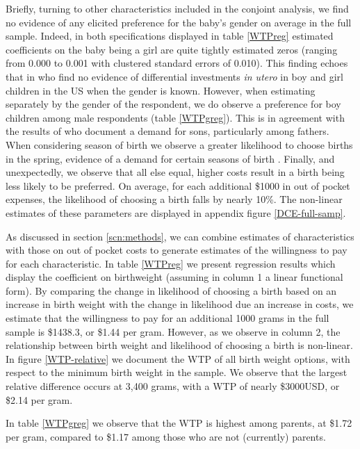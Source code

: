 \documentclass[a4paper, 11pt]{article}
\begin{document}
\begin{spacing}{1.4}
Briefly, turning to other characteristics included in the conjoint analysis,
we find no evidence of any elicited preference for the baby's gender
on average in the full sample.  Indeed, in both specifications displayed
in table \ref{WTPreg} estimated coefficients on the baby being a girl are
quite tightly estimated zeros (ranging from 0.000 to 0.001 with clustered
standard errors of 0.010). This finding echoes that in \citet{LhilaSimon2008}
who find no evidence of differential investments \emph{in utero} in boy and
girl children in the US when the gender is known.  However, when estimating
separately by the gender of the respondent, we do observe a preference for
boy children among male respondents (table \ref{WTPgreg}). This is in
agreement with the results of \citet{DahlMoretti2008} who document a demand
for sons, particularly among fathers.  When considering season of birth
we observe a greater likelihood to choose births in the spring, evidence
of a demand for certain seasons of birth \citep{Clarkeetal2016}. Finally,
and unexpectedly, we observe that all else equal, higher costs result in
a birth being less likely to be preferred.  On average, for each additional
\$1000 in out of pocket expenses, the likelihood of choosing a birth falls by
nearly 10\%.  The non-linear estimates of these parameters are displayed
in appendix figure \ref{DCE-full-samp}.

As discussed in section \ref{scn:methods}, we can combine estimates of
characteristics with those on out of pocket costs to generate estimates
of the willingness to pay for each characteristic.  In table \ref{WTPreg}
we present regression results which display the coefficient on birthweight
(assuming in column 1 a linear functional form).  By comparing the change
in likelihood of choosing a birth based on an increase in birth weight
with the change in likelihood due an increase in costs, we estimate that
the willingness to pay for an additional 1000 grams in the full sample
is \$1438.3, or \$1.44 per gram.  However, as we observe in column 2,
the relationship between birth weight and likelihood of choosing a birth
is non-linear.  In figure \ref{WTP-relative} we document the WTP of all
birth weight options, with respect to the minimum birth weight in the
sample.  We observe that the largest relative difference occurs at 3,400
grams, with a WTP of nearly \$3000USD, or \$2.14 per gram.

In table \ref{WTPgreg} we observe that the WTP is highest among parents,
at \$1.72 per gram, compared to \$1.17 among those who are not (currently)
parents.


\end{spacing}
\end{document}
